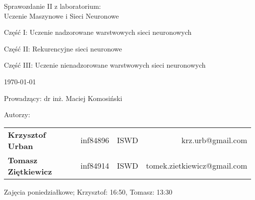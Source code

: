\thispagestyle{empty} %

\begin{center}
{\large{Sprawozdanie II z laboratorium:\\
Uczenie Maszynowe i Sieci Neuronowe}}

\vspace{3ex}

Część I: Uczenie nadzorowane warstwowych sieci neuronowych

Część II: Rekurencyjne sieci neuronowe

Część III: Uczenie nienadzorowane warstwowych sieci neuronowych


\vspace{3ex}
{\footnotesize\today}

\end{center}


\vspace{10ex}

Prowadzący: dr inż. Maciej Komosiński

\vspace{5ex}

Autorzy:
\begin{tabular}{lllr}
\textbf{Krzysztof Urban} & inf84896 & ISWD & krz.urb@gmail.com \\
\textbf{Tomasz Ziętkiewicz} & inf84914 & ISWD & tomek.zietkiewicz@gmail.com \\
\end{tabular}

\vspace{5ex}

Zajęcia poniedziałkowe; Krzysztof: 16:50, Tomasz: 13:30

\newpage

